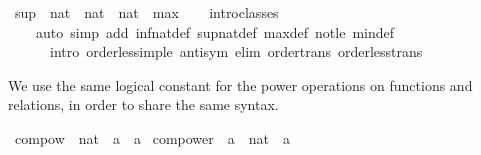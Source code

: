 \begin{isabellebody}
\isamarkupfalse%
\ {\isachardoublequoteopen}{\isacharparenleft}{\kern0pt}sup\ {\isacharcolon}{\kern0pt}{\isacharcolon}{\kern0pt}\ nat\ {\isasymRightarrow}\ nat\ {\isasymRightarrow}\ nat{\isacharparenright}{\kern0pt}\ {\isacharequal}{\kern0pt}\ max{\isachardoublequoteclose}\isanewline
\isanewline
{}\isamarkupfalse%
\isanewline
%
\isadelimproof
\ \ %
\endisadelimproof
%
\isatagproof
{}\isamarkupfalse%
\ intro{\isacharunderscore}{\kern0pt}classes\isanewline
\ \ \ \ {\isacharparenleft}{\kern0pt}auto\ simp\ add{\isacharcolon}{\kern0pt}\ inf{\isacharunderscore}{\kern0pt}nat{\isacharunderscore}{\kern0pt}def\ sup{\isacharunderscore}{\kern0pt}nat{\isacharunderscore}{\kern0pt}def\ max{\isacharunderscore}{\kern0pt}def\ not{\isacharunderscore}{\kern0pt}le\ min{\isacharunderscore}{\kern0pt}def\isanewline
\ \ \ \ \ \ intro{\isacharcolon}{\kern0pt}\ order{\isacharunderscore}{\kern0pt}less{\isacharunderscore}{\kern0pt}imp{\isacharunderscore}{\kern0pt}le\ antisym\ elim{\isacharbang}{\kern0pt}{\isacharcolon}{\kern0pt}\ order{\isacharunderscore}{\kern0pt}trans\ order{\isacharunderscore}{\kern0pt}less{\isacharunderscore}{\kern0pt}trans{\isacharparenright}{\kern0pt}%
\endisatagproof
{\isafoldproof}%
%
\isadelimproof
\isanewline
%
\endisadelimproof
\isanewline
{}\isamarkupfalse%
%
\isadelimdocument
%
\endisadelimdocument
%
\isatagdocument
%
\isamarkuptrue%
%
\endisatagdocument
{\isafolddocument}%
%
\isadelimdocument
%
\endisadelimdocument
%
\begin{isamarkuptext}%
We use the same logical constant for the power operations on
  functions and relations, in order to share the same syntax.%
\end{isamarkuptext}\isamarkuptrue%
\isamarkupfalse%
\ compow\ {\isacharcolon}{\kern0pt}{\isacharcolon}{\kern0pt}\ {\isachardoublequoteopen}nat\ {\isasymRightarrow}\ {\isacharprime}{\kern0pt}a\ {\isasymRightarrow}\ {\isacharprime}{\kern0pt}a{\isachardoublequoteclose}\isanewline
\isanewline
{}\isamarkupfalse%
\ compower\ {\isacharcolon}{\kern0pt}{\isacharcolon}{\kern0pt}\ {\isachardoublequoteopen}{\isacharprime}{\kern0pt}a\ {\isasymRightarrow}\ nat\ {\isasymRightarrow}\ {\isacharprime}{\kern0pt}a{\isachardoublequoteclose}\ {\isacharparenleft}{\kern0pt}\ {\isachardoublequoteopen}{\isacharcircum}{\kern0pt}{\isacharcircum}{\kern0pt}{\isachardoublequoteclose}\ {}{}{\isacharparenright}{\kern0pt}\isanewline

\end{isabellebody}
